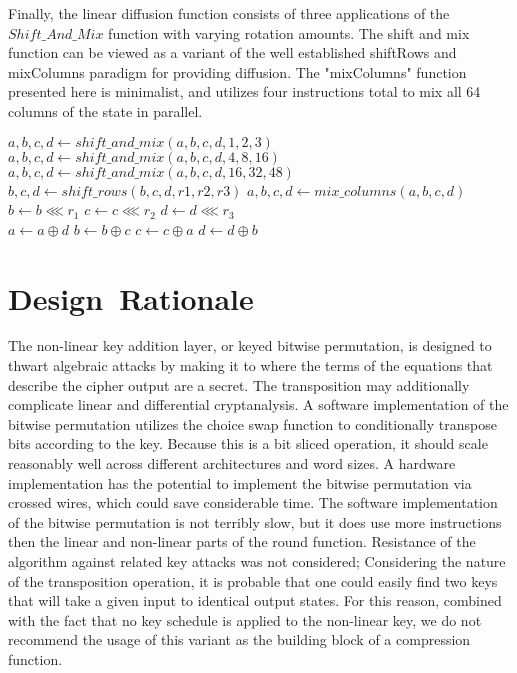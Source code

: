 \documentclass[preprint]{iacrtrans}
\begin{document}
Finally, the linear diffusion function consists of three applications of the $Shift\_And\_Mix$ function with varying rotation amounts. The shift and mix function can be viewed as a variant of the well established shiftRows and mixColumns paradigm for providing diffusion. The "mixColumns" function presented here is minimalist, and utilizes four instructions total to mix all 64 columns of the state in parallel. \\

\begin{algorithmic}
	\State $a, b, c, d \gets shift\_and\_mix(a, b, c, d, 1, 2, 3)$
	\State $a, b, c, d \gets shift\_and\_mix(a, b, c, d, 4, 8, 16)$
	\State $a, b, c, d \gets shift\_and\_mix(a, b, c, d, 16, 32, 48)$
\EndFunction\\

	\State $b, c, d \gets shift\_rows(b, c, d, r1, r2, r3)$
	\State $a, b, c, d \gets mix\_columns(a, b, c, d)$
\EndFunction\\

	\State $b\gets b \lll r_1$
	\State $c \gets c \lll r_2$
	\State $d \gets d \lll r_3$
\EndFunction\\

	\State $a \gets a \oplus d$
	\State $b \gets b \oplus c$
	\State $c \gets c \oplus a$
	\State $d \gets d \oplus b$
\EndFunction\\
\end{algorithmic}

\section{Design\ Rationale}
The non-linear key addition layer, or keyed bitwise permutation, is designed to thwart algebraic attacks by making it to where the terms of the equations that describe the cipher output are a secret. The transposition may additionally complicate linear and differential cryptanalysis. A software implementation of the bitwise permutation utilizes the choice swap function to conditionally transpose bits according to the key. Because this is a bit sliced operation, it should scale reasonably well across different architectures and word sizes. A hardware implementation has the potential to implement the bitwise permutation via crossed wires, which could save considerable time. The software implementation of the bitwise permutation is not terribly slow, but it does use more instructions then the linear and non-linear parts of the round function. Resistance of the algorithm against related key attacks was not considered; Considering the nature of the transposition operation, it is probable that one could easily find two keys that will take a given input to identical output states. For this reason, combined with the fact that no key schedule is applied to the non-linear key, we do not recommend the usage of this variant as the building block of a compression function.
\end{document}
